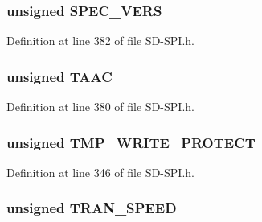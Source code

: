 \hypertarget{union_c_s_d_a696138d4cf945062a409e5271699d319}{}
\subsubsection[{S\+P\+E\+C\+\_\+\+V\+E\+R\+S}]{\setlength{\rightskip}{0pt plus 5cm}unsigned S\+P\+E\+C\+\_\+\+V\+E\+R\+S}\label{union_c_s_d_a696138d4cf945062a409e5271699d319}


Definition at line 382 of file S\+D-\/\+S\+P\+I.\+h.

\hypertarget{union_c_s_d_a5b0c9f3af14c08ef04c368b5e5325b85}{}
\subsubsection[{T\+A\+A\+C}]{\setlength{\rightskip}{0pt plus 5cm}unsigned T\+A\+A\+C}\label{union_c_s_d_a5b0c9f3af14c08ef04c368b5e5325b85}


Definition at line 380 of file S\+D-\/\+S\+P\+I.\+h.

\hypertarget{union_c_s_d_ad993e84c7363e572015ecd4febd287ae}{}
\subsubsection[{T\+M\+P\+\_\+\+W\+R\+I\+T\+E\+\_\+\+P\+R\+O\+T\+E\+C\+T}]{\setlength{\rightskip}{0pt plus 5cm}unsigned T\+M\+P\+\_\+\+W\+R\+I\+T\+E\+\_\+\+P\+R\+O\+T\+E\+C\+T}\label{union_c_s_d_ad993e84c7363e572015ecd4febd287ae}


Definition at line 346 of file S\+D-\/\+S\+P\+I.\+h.

\hypertarget{union_c_s_d_a59f2af55101b38c975a798fa0b35ed3f}{}
\subsubsection[{T\+R\+A\+N\+\_\+\+S\+P\+E\+E\+D}]{\setlength{\rightskip}{0pt plus 5cm}unsigned T\+R\+A\+N\+\_\+\+S\+P\+E\+E\+D}\label{union_c_s_d_a59f2af55101b38c975a798fa0b35ed3f}


